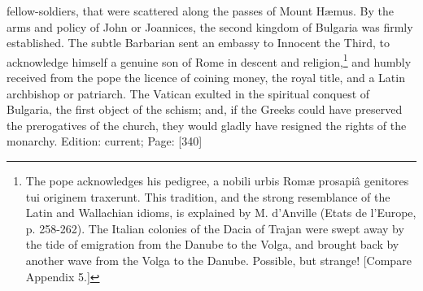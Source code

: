 fellow-soldiers, that were scattered along the passes of Mount Hæmus. By the arms and policy of John or Joannices, the second kingdom of Bulgaria was firmly established. The subtle Barbarian sent an embassy to Innocent the Third, to acknowledge himself a genuine son of Rome in descent and religion,\footnote{The pope acknowledges his pedigree, a nobili urbis Romæ prosapiâ genitores tui originem traxerunt. This tradition, and the strong resemblance of the Latin and Wallachian idioms, is explained by M. d\texthebrew{}’Anville (Etats de l\texthebrew{}’Europe, p. 258-262). The Italian colonies of the Dacia of Trajan were swept away by the tide of emigration from the Danube to the Volga, and brought back by another wave from the Volga to the Danube. Possible, but strange! [Compare Appendix 5.]} and humbly received from the pope the licence of coining money, the royal title, and a Latin archbishop or patriarch. The Vatican exulted in the spiritual conquest of Bulgaria, the first object of the schism; and, if the Greeks could have preserved the prerogatives of the church, they would gladly have resigned the rights of the monarchy.
Edition: current; Page: [340]

